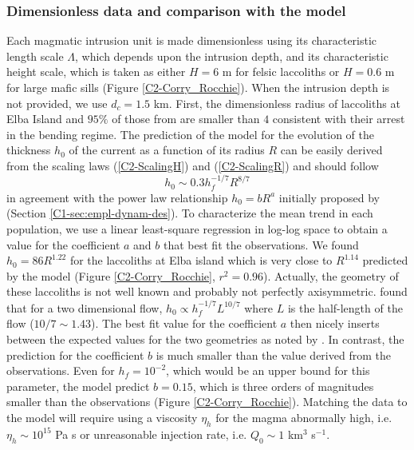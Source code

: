 \subsubsection*{Dimensionless data and comparison with the model}


Each  magmatic   intrusion  unit  is  made   dimensionless  using  its
characteristic  length   scale  $\Lambda$,  which  depends   upon  the
intrusion depth, and  its characteristic height scale,  which is taken
as either $H=6$  m for felsic laccoliths or $H=0.6$  m for large mafic
sills (Figure \ref{C2-Corry_Rocchie}). When the intrusion depth is not
provided, we  use $d_c=1.5$  km.  First,  the dimensionless  radius of
laccoliths at  Elba Island and  $95\%$ of those  from \citet{E:2015tl}
are  smaller than  $4$ consistent  with  their arrest  in the  bending
regime.   The  prediction  of  the  model for  the  evolution  of  the
thickness $h_0$ of the current as a  function of its radius $R$ can be
easily  derived   from  the   scaling  laws   (\ref{C2-ScalingH})  and
(\ref{C2-ScalingR}) and should follow
\begin{equation}
  h_0 \sim 0.3h_f^{-1/7} R^{8/7}\label{C2-Hr}
\end{equation}
in agreement  with the power  law relationship $h_0 =  bR^a$ initially
proposed         by          \citet{McCaffrey:1997ea}         (Section
\ref{C1-sec:empl-dynam-des}).  To characterize the  mean trend in each
population, we use  a linear least-square regression  in log-log space
to obtain a  value for the coefficient  $a$ and $b$ that  best fit the
observations.  We found $h_0 = 86 R^{1.22}$ for the laccoliths at Elba
island  which is  very  close  to $R^{1.14}$  predicted  by the  model
(Figure \ref{C2-Corry_Rocchie},  $r^2=0.96$).  Actually,  the geometry
of  these laccoliths  is not  well  known and  probably not  perfectly
axisymmetric.   \citet{Anonymous:QWXp_4JV}   found  that  for   a  two
dimensional  flow, $h_0\propto  h_f^{-1/7}L^{10/7}$ where  $L$ is  the
half-length of the flow ($10/7\sim 1.43$).  The best fit value for the
coefficient $a$  then nicely inserts  between the expected  values for
the two  geometries as noted by  \citet{Michaut:2011kg}.  In contrast,
the prediction for the coefficient $b$  is much smaller than the value
derived from the observations.  Even for $h_f=10^{-2}$, which would be
an upper bound  for this parameter, the model  predict $b=0.15$, which
is three  orders of magnitudes  smaller than the  observations (Figure
\ref{C2-Corry_Rocchie}).  Matching the data  to the model will require
using  a  viscosity  $\eta_h$  for the  magma  abnormally  high,  i.e.
$\eta_h   \sim  10^{15}$   Pa  s   or  unreasonable   injection  rate,
i.e. $Q_0\sim 1$ km$^3$ s$^{-1}$.

